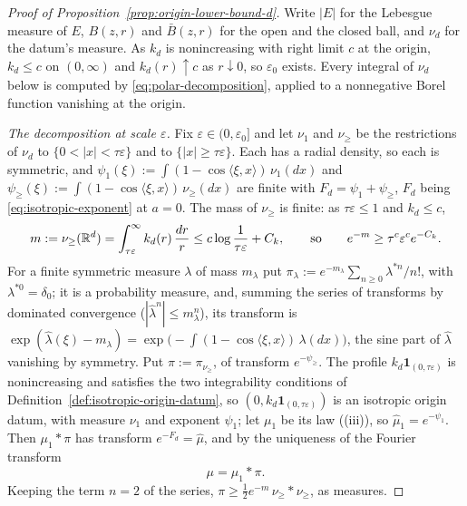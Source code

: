 \begin{proof}[Proof of Proposition~\ref{prop:origin-lower-bound-d}]
Write $|E|$ for the Lebesgue measure of $E$, $B(z,r)$ and $\bar B(z,r)$ for the open and the closed
ball, and $\nu_d$ for the datum's \Levy{} measure. As $k_d$ is nonincreasing with right limit $c$ at
the origin, $k_d \le c$ on $(0,\infty)$ and $k_d(r) \uparrow c$ as $r \downarrow 0$, so
$\varepsilon_0$ exists. Every integral of $\nu_d$ below is computed by \ref{eq:polar-decomposition},
applied to a nonnegative Borel function vanishing at the origin.

\emph{The decomposition at scale $\varepsilon$.} Fix $\varepsilon \in (0,\varepsilon_0]$ and let
$\nu_1$ and $\nu_{\ge}$ be the restrictions of $\nu_d$ to $\{0 < |x| < \tau\varepsilon\}$ and to
$\{|x| \ge \tau\varepsilon\}$. Each has a radial density, so each is symmetric, and
$\psi_1(\xi) := \int(1 - \cos\langle\xi,x\rangle)\,\nu_1(dx)$ and
$\psi_{\ge}(\xi) := \int(1 - \cos\langle\xi,x\rangle)\,\nu_{\ge}(dx)$ are finite with
$F_d = \psi_1 + \psi_{\ge}$, $F_d$ being \ref{eq:isotropic-exponent} at $a = 0$. The mass of
$\nu_{\ge}$ is finite: as $\tau\varepsilon \le 1$ and $k_d \le c$,
\[
  m := \nu_{\ge}(\mathbb{R}^d) = \int_{\tau\varepsilon}^{\infty}k_d(r)\,\frac{dr}{r}
   \le c\log\frac{1}{\tau\varepsilon} + C_k ,
  \qquad\text{so}\qquad e^{-m} \ge \tau^c\varepsilon^c e^{-C_k} .
\]
For a finite symmetric measure $\lambda$ of mass $m_\lambda$ put
$\pi_\lambda := e^{-m_\lambda}\sum_{n\ge0}\lambda^{*n}/n!$, with $\lambda^{*0} = \delta_0$; it is a
probability measure, and, summing the series of transforms by dominated convergence
($|\widehat\lambda^n| \le m_\lambda^n$), its transform is
$\exp(\widehat\lambda(\xi) - m_\lambda) = \exp\bigl(-\int(1 - \cos\langle\xi,x\rangle)\,\lambda(dx)\bigr)$,
the sine part of $\widehat\lambda$ vanishing by symmetry. Put $\pi := \pi_{\nu_{\ge}}$, of transform
$e^{-\psi_{\ge}}$. The profile $k_d\mathbf 1_{(0,\tau\varepsilon)}$ is nonincreasing and satisfies the
two integrability conditions of Definition~\ref{def:isotropic-origin-datum}, so
$(0, k_d\mathbf 1_{(0,\tau\varepsilon)})$ is an isotropic origin datum, with \Levy{} measure $\nu_1$
and exponent $\psi_1$; let $\mu_1$ be its law ((iii)), so $\widehat\mu_1 = e^{-\psi_1}$.
Then $\mu_1 * \pi$ has transform $e^{-F_d} = \widehat\mu$, and by the uniqueness of the Fourier
transform
\[
  \mu = \mu_1 * \pi .
\]
Keeping the term $n = 2$ of the series, $\pi \ge \tfrac12 e^{-m}\,\nu_{\ge} * \nu_{\ge}$, as measures.


\end{proof}
